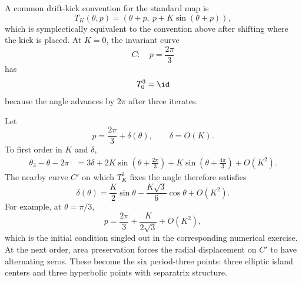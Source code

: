 \begin{example}
A common drift-kick convention for the standard map is
\[
  T_K(\theta,p)=\left(\theta+p,\ p+K\sin(\theta+p)\right),
\]
which is symplectically equivalent to the convention above after shifting where
the kick is placed. At \(K=0\), the invariant curve
\[
  C:\quad p=\frac{2\pi}{3}
\]
has
\[
  T_0^3=\id
\]
because the angle advances by \(2\pi\) after three iterates.

Let
\[
  p=\frac{2\pi}{3}+\delta(\theta),
  \qquad
  \delta=O(K).
\]
To first order in \(K\) and \(\delta\),
\[
\begin{aligned}
  \theta_3-\theta-2\pi
  &=
  3\delta
  +
  2K\sin\left(\theta+\frac{2\pi}{3}\right)
  +
  K\sin\left(\theta+\frac{4\pi}{3}\right)
  +O(K^2).
\end{aligned}
\]
The nearby curve \(C'\) on which \(T_K^3\) fixes the angle therefore satisfies
\[
  \boxed{
  \delta(\theta)
  =
  \frac{K}{2}\sin\theta
  -
  \frac{K\sqrt3}{6}\cos\theta
  +
  O(K^2).
  }
\]
For example, at \(\theta=\pi/3\),
\[
  p=\frac{2\pi}{3}+\frac{K}{2\sqrt3}+O(K^2),
\]
which is the initial condition singled out in the corresponding numerical
exercise. At the next order, area preservation forces the radial displacement
on \(C'\) to have alternating zeros. These become the six period-three points:
three elliptic island centers and three hyperbolic points with separatrix
structure.
\end{example}

